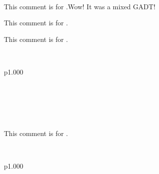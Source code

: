 \\
\begin{ocamlindent}This comment is for .Wow! It was a mixed GADT!\end{ocamlindent}%
\medbreak
\label{Ocamlary--type-alias}\begin{ocamlindent}This comment is for .\end{ocamlindent}%
\medbreak
\label{Ocamlary--type-tuple}\begin{ocamlindent}This comment is for .\end{ocamlindent}%
\medbreak
\label{Ocamlary--type-variant_alias}\\
\begin{ocamltabular}{p{1.000\textwidth}}\label{Ocamlary--type-variant_alias.TagA}\\
\label{Ocamlary--type-variant_alias.ConstrB}\\
\label{Ocamlary--type-variant_alias.ConstrC}\\
\label{Ocamlary--type-variant_alias.ConstrD}\\
\end{ocamltabular}%
\\
\begin{ocamlindent}This comment is for .\end{ocamlindent}%
\medbreak
\label{Ocamlary--type-record_alias}\\
\begin{ocamltabular}{p{1.000\textwidth}}\label{Ocamlary--type-record_alias.field1}\\
\label{Ocamlary--type-record_alias.field2}\\
\end{ocamltabular}%
